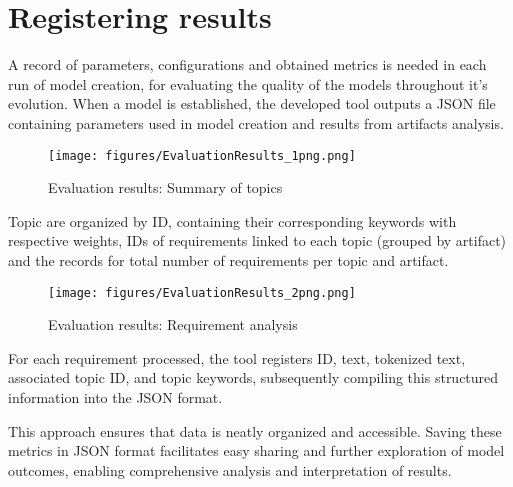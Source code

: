 \section{Registering results}



A record of parameters, configurations and obtained metrics is needed in each run of model creation, for evaluating the quality of the models throughout it's evolution. When a  model is established, the developed tool outputs a JSON file containing parameters used in model creation and results from artifacts analysis.

\begin{figure}[h]
    \centering
    \texttt{[image: figures/EvaluationResults\_1png.png]}
    \caption{Evaluation results: Summary of topics}
    \label{fig:EvaluationResults_1png}
\end{figure}

Topic are organized by ID, containing their corresponding keywords with respective weights, IDs of requirements linked to each topic (grouped by artifact) and the records for total number of requirements per topic and artifact. 

\begin{figure}[h]
    \centering
    \texttt{[image: figures/EvaluationResults\_2png.png]}
    \caption{Evaluation results: Requirement analysis}
    \label{fig:EvaluationResults_2png}
\end{figure}

For each requirement processed, the tool registers ID, text, tokenized text, associated topic ID, and topic keywords, subsequently compiling this structured information into the JSON format. 

This approach ensures that data is neatly organized and accessible. Saving these metrics in JSON format facilitates easy sharing and further exploration of model outcomes, enabling comprehensive analysis and interpretation of results.


